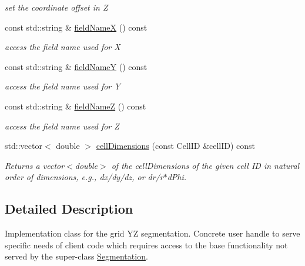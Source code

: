 \begin{DoxyCompactItemize}
\begin{DoxyCompactList}\small\item\em set the coordinate offset in Z \item\end{DoxyCompactList}\item 
const std::string \& \hyperlink{class_d_d4hep_1_1_geometry_1_1_cartesian_grid_y_z_abf3ec171bf18377a98c042be1b84cfa6}{fieldNameX} () const 
\begin{DoxyCompactList}\small\item\em access the field name used for X \item\end{DoxyCompactList}\item 
const std::string \& \hyperlink{class_d_d4hep_1_1_geometry_1_1_cartesian_grid_y_z_aa54f02a42ce3caf3fee0fffdb7105bc2}{fieldNameY} () const 
\begin{DoxyCompactList}\small\item\em access the field name used for Y \item\end{DoxyCompactList}\item 
const std::string \& \hyperlink{class_d_d4hep_1_1_geometry_1_1_cartesian_grid_y_z_a51881162bbb8a8102601d5d8a42ddd18}{fieldNameZ} () const 
\begin{DoxyCompactList}\small\item\em access the field name used for Z \item\end{DoxyCompactList}\item 
std::vector$<$ double $>$ \hyperlink{class_d_d4hep_1_1_geometry_1_1_cartesian_grid_y_z_ad977bcb19f482630f8bb3081fc4e6656}{cellDimensions} (const CellID \&cellID) const 
\begin{DoxyCompactList}\small\item\em Returns a vector$<$double$>$ of the cellDimensions of the given cell ID in natural order of dimensions, e.g., dx/dy/dz, or dr/r$\ast$dPhi. \item\end{DoxyCompactList}\end{DoxyCompactItemize}


\subsection{Detailed Description}
Implementation class for the grid YZ segmentation. Concrete user handle to serve specific needs of client code which requires access to the base functionality not served by the super-\/class \hyperlink{class_d_d4hep_1_1_geometry_1_1_segmentation}{Segmentation}.


